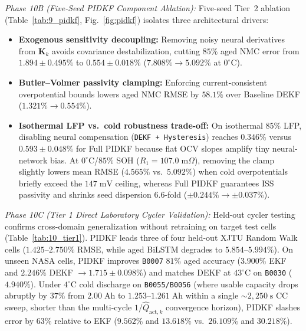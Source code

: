 \documentclass[10pt,a4paper]{article}
\begin{document}
\emph{Phase 10B (Five-Seed PIDKF Component Ablation):} Five-seed Tier~2 ablation (Table~\ref{tab:9_pidkf}, Fig.~\ref{fig:pidkf}) isolates three architectural drivers:
\begin{itemize}
\item \textbf{Exogenous sensitivity decoupling:} Removing noisy neural derivatives from $\mathbf{K}_k$ avoids covariance destabilization, cutting $85\%$ aged NMC error from $1.894\pm0.495\%$ to $0.554\pm0.018\%$ ($7.808\% \rightarrow 5.092\%$ at $0^\circ\text{C}$).
\item \textbf{Butler--Volmer passivity clamping:} Enforcing current-consistent overpotential bounds lowers aged NMC RMSE by $58.1\%$ over Baseline DEKF ($1.321\% \rightarrow 0.554\%$).
\item \textbf{Isothermal LFP vs.\ cold robustness trade-off:} On isothermal $85\%$ LFP, disabling neural compensation (\texttt{DEKF + Hysteresis}) reaches $0.346\%$ versus $0.593\pm0.048\%$ for Full PIDKF because flat OCV slopes amplify tiny neural-network bias. At $0^\circ\text{C}$/$85\%$ SOH ($R_1 = 107.0\;\mathrm{m}\Omega$), removing the clamp slightly lowers mean RMSE ($4.565\%$ vs.\ $5.092\%$) when cold overpotentials briefly exceed the $147\;\mathrm{mV}$ ceiling, whereas Full PIDKF guarantees ISS passivity and shrinks seed dispersion $6.6$-fold ($\pm 0.244\% \rightarrow \pm 0.037\%$).
\end{itemize}

\emph{Phase 10C (Tier 1 Direct Laboratory Cycler Validation):} Held-out cycler testing confirms cross-domain generalization without retraining on target test cells (Table~\ref{tab:10_tier1}). PIDKF leads three of four held-out XJTU Random Walk cells ($1.425\text{--}2.750\%$ RMSE, while aged BiLSTM degrades to $5.854\text{--}5.994\%$). On unseen NASA cells, PIDKF improves \texttt{B0007} $81\%$ aged accuracy ($3.900\%$ EKF and $2.246\%$ DEKF $\rightarrow 1.715\pm0.098\%$) and matches DEKF at $43^\circ\text{C}$ on \texttt{B0030} ($4.940\%$). Under $4^\circ\text{C}$ cold discharge on \texttt{B0055/B0056} (where usable capacity drops abruptly by $37\%$ from $2.00\;\mathrm{Ah}$ to $1.253\text{--}1.261\;\mathrm{Ah}$ within a single $\sim 2,250\;\mathrm{s}$ CC sweep, shorter than the multi-cycle $1/\hat{Q}_{\text{act},k}$ convergence horizon), PIDKF slashes error by $63\%$ relative to EKF ($9.562\%$ and $13.618\%$ vs.\ $26.109\%$ and $30.218\%$).
\end{document}
